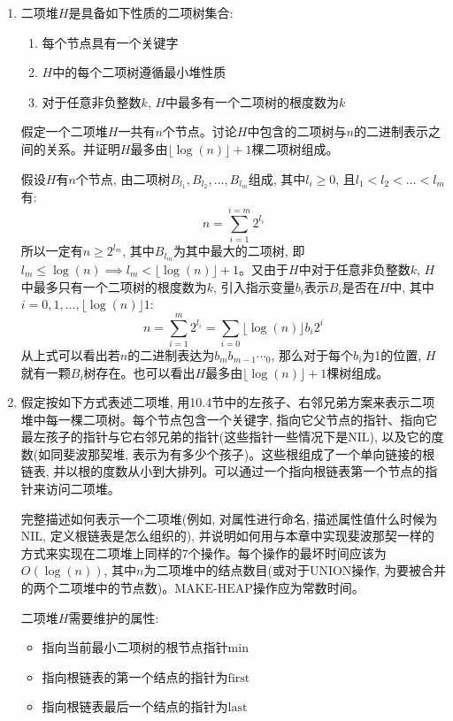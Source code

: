 \documentclass[paper=a4, fontsize=11pt]{scrartcl} %
\numberwithin{equation}{section} %
\numberwithin{figure}{section} %
\numberwithin{table}{section} %
\begin{document}
\begin{enumerate}[a]
  \item 二项堆$H$是具备如下性质的二项树集合:
    \begin{enumerate}[1]
    \item 每个节点具有一个关键字
    \item $H$中的每个二项树遵循最小堆性质
    \item 对于任意非负整数$k$, $H$中最多有一个二项树的根度数为$k$
    \end{enumerate}
    假定一个二项堆$H$一共有$n$个节点。讨论$H$中包含的二项树与$n$的二进制表示之间的关系。并证明$H$最多由$\lfloor \log(n) \rfloor + 1$棵二项树组成。

    \begin{addmargin}[3em]{0em}
      假设$H$有$n$个节点, 由二项树$B_{l_1}, B_{l_2}, \dots, B_{l_m}$组成, 其中$l_i \geq 0$, 且$l_1 < l_2 < \dots < l_m$有:
      \[
      n = \displaystyle\sum_{i=1}^{i=m} 2^{l_i}
      \]
      所以一定有$n \geq 2^{l_m}$, 其中$B_{l_m}$为其中最大的二项树, 即$l_m \leq \log(n) \implies l_m < \lfloor \log(n) \rfloor + 1$。又由于$H$中对于任意非负整数$k$, $H$中最多只有一个二项树的根度数为$k$, 引入指示变量$b_i$表示$B_i$是否在$H$中, 其中$i = 0, 1, \dots, \lfloor \log(n) \rfloor 1$:
      \[
      n = \displaystyle\sum_{i=1}^{m} 2^{l_i} = \displaystyle\sum_{i=0}{\lfloor \log(n) \rfloor } b_i 2^{i}
      \]
      从上式可以看出若$n$的二进制表达为$b_mb_{m-1}\dotsb_{0}$, 那么对于每个$b_i$为1的位置, $H$就有一颗$B_i$树存在。也可以看出$H$最多由$\lfloor \log(n) \rfloor + 1$棵树组成。
    \end{addmargin}

  \item 假定按如下方式表述二项堆, 用10.4节中的左孩子、右邻兄弟方案来表示二项堆中每一棵二项树。每个节点包含一个关键字, 指向它父节点的指针、指向它最左孩子的指针与它右邻兄弟的指针(这些指针一些情况下是$\mbox{NIL}$), 以及它的度数(如同斐波那契堆, 表示为有多少个孩子)。这些根组成了一个单向链接的根链表, 并以根的度数从小到大排列。可以通过一个指向根链表第一个节点的指针来访问二项堆。

    完整描述如何表示一个二项堆(例如, 对属性进行命名, 描述属性值什么时候为$\mbox{NIL}$, 定义根链表是怎么组织的), 并说明如何用与本章中实现斐波那契一样的方式来实现在二项堆上同样的7个操作。每个操作的最坏时间应该为$O(\log(n))$, 其中$n$为二项堆中的结点数目(或对于$\mbox{UNION}$操作, 为要被合并的两个二项堆中的节点数)。$\mbox{MAKE-HEAP}$操作应为常数时间。

    \begin{addmargin}[3em]{0em}
      二项堆$H$需要维护的属性:
      \begin{itemize}
        \item 指向当前最小二项树的根节点指针$\mbox{min}$
        \item 指向根链表的第一个结点的指针为$\mbox{first}$
        \item 指向根链表最后一个结点的指针为$\mbox{last}$
      \end{itemize}


\end{addmargin}
\end{enumerate}
\end{document}
